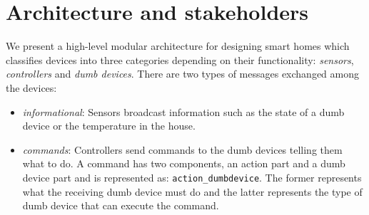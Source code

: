 \documentclass{article}
\begin{document}
\section{Architecture and stakeholders}
\label{sec:archi}
We present a high-level modular architecture for designing smart homes which classifies devices into three categories depending on their functionality: \textit{sensors}, \textit{controllers} and \textit{dumb devices}. There are two types of messages exchanged among the devices: 
\begin{itemize}[topsep=0pt,itemsep=-1ex,partopsep=1ex,parsep=1ex]
    \item \textit{informational}: Sensors broadcast information such as the state of a dumb device or the temperature in the house.  
    \item \textit{commands}: Controllers send commands to the dumb devices telling them what to do. A command has two components, an action part and a dumb device part and is represented as:   \texttt{action\_dumbdevice}. The former represents what the receiving dumb device must do and the latter represents the type of dumb device that can execute the command.
\end{itemize}
\end{document}
